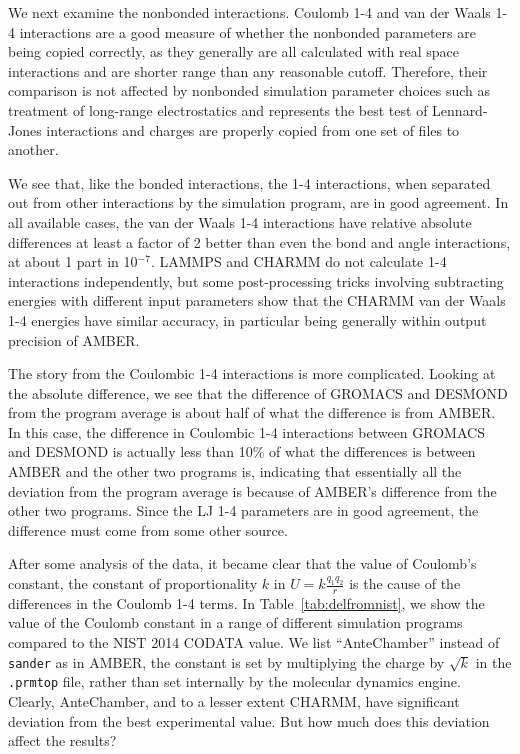 We next examine the nonbonded interactions. Coulomb 1-4 and van der
Waals 1-4 interactions are a good measure of whether the nonbonded
parameters are being copied correctly, as they generally are all
calculated with real space interactions and are shorter range than any
reasonable cutoff. Therefore, their comparison is not affected by
nonbonded simulation parameter choices such as treatment of long-range
electrostatics and represents the best test of Lennard-Jones
interactions and charges are properly copied from one set of files to
another.

We see that, like the bonded interactions, the 1-4 interactions, when
separated out from other interactions by the simulation program, are
in good agreement.  In all available cases, the van der Waals 1-4
interactions have relative absolute differences at least a factor of 2
better than even the bond and angle interactions, at about 1 part in
10$^{-7}$. LAMMPS and CHARMM do not calculate 1-4 interactions
independently, but some post-processing tricks involving subtracting
energies with different input parameters show that the CHARMM van der
Waals 1-4 energies have similar accuracy, in particular being
generally within output precision of AMBER.

The story from the Coulombic 1-4 interactions is more
complicated. Looking at the absolute difference, we see that the
difference of GROMACS and DESMOND from the program average is about
half of what the difference is from AMBER. In this case, the
difference in Coulombic 1-4 interactions between GROMACS and DESMOND
is actually less than 10\% of what the differences is between AMBER
and the other two programs is, indicating that essentially all the
deviation from the program average is because of AMBER's difference
from the other two programs. 
Since the LJ 1-4 parameters 
are in good
agreement, the difference must come from some other source.

After some analysis of the data, it became clear that the value of
Coulomb's constant, the constant of proportionality $k$ in $U =
k\frac{q_1q_2}{r}$ is the cause of the differences in the Coulomb 1-4
terms. In Table~\ref{tab:delfromnist}, we show the value of the
Coulomb constant in a range of different simulation programs compared
to the NIST 2014 CODATA value.  We list ``AnteChamber'' instead of
{\tt sander} as in AMBER, the constant is set by multiplying the
charge by $\sqrt{k}$ in the {\tt .prmtop} file, rather than set
internally by the molecular dynamics engine.  Clearly, AnteChamber,
and to a lesser extent CHARMM, have significant deviation from the
best experimental value.  But how much does this deviation affect the
results?

